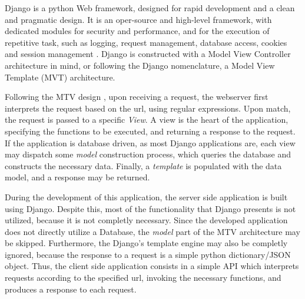 Django \cite{django} is a python Web framework, designed for rapid development and a clean and pragmatic design. 
It is an oper-source and high-level framework, with dedicated modules for security and performance,
and for the execution of repetitive
task, such as logging, request management, database access, cookies and session management \cite{django_docs}.
Django is constructed with a Model View Controller architecture in mind, or following
the Django nomenclature, a Model View Template (MVT) architecture.

Following the MTV design \cite{learn_django}, upon receiving a request, the webserver first interprets the request based on the 
url, using regular expressions. Upon match, the request is passed to a specific \textit{View}.
A view is the heart of the application, specifying the functions to be executed, and 
returning a response to the request. If the application is database driven,
as most Django applications are, each view may dispatch some \textit{model} construction process,
which queries the database and constructs the necessary data. Finally,
a \textit{template} is populated with the data model, and a response may be returned.

During the development of this application, the server side application is built using Django.
Despite this, most of the functionality that Django presents is not utilized, because it is not completly necessary.
Since the developed application does not directly utilize a Database, the \textit{model} 
part of the MTV architecture may be skipped. Furthermore, the Django's template 
engine may also be completly ignored, because the response to a request is a simple 
python dictionary/JSON object. Thus, the client side application consists in a simple API which interprets requests
according to the specified url, invoking the necessary functions,
and produces a response to each request. 